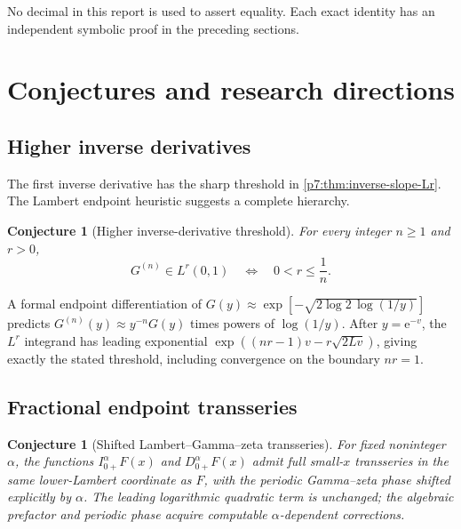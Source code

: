\documentclass[11pt,oneside]{article}
\newtheorem{conjecture}[theorem]{Conjecture}
\theoremstyle{definition}
\theoremstyle{remark}
\newcommand{\e}{\mathrm e}
\newcommand{\1}{\mathbf 1}
\begin{document}
No decimal in this report is used to assert equality.  Each exact identity has an independent
symbolic proof in the preceding sections.

\section{Conjectures and research directions}
\label{p7:sec:future}

\subsection{Higher inverse derivatives}

The first inverse derivative has the sharp threshold in \cref{p7:thm:inverse-slope-Lr}.  The
Lambert endpoint heuristic suggests a complete hierarchy.

\begin{conjecture}[Higher inverse-derivative threshold]
\label{p7:conj:higher-G-derivatives}
For every integer $n\ge1$ and $r>0$,
\begin{equation}
 G^{(n)}\in L^r(0,1)
 \quad\Longleftrightarrow\quad
 0<r\le\frac1n.
 \label{p7:eq:conj-higher-G}
\end{equation}
\statusopen
\end{conjecture}

A formal endpoint differentiation of
$G(y)\approx\exp[-\sqrt{2\log2\,\log(1/y)}]$ predicts
$G^{(n)}(y)\approx y^{-n}G(y)$ times powers of $\log(1/y)$.  After $y=\e^{-v}$, the $L^r$
integrand has leading exponential $\exp((nr-1)v-r\sqrt{2Lv})$, giving exactly the stated
threshold, including convergence on the boundary $nr=1$.

\subsection{Fractional endpoint transseries}

\begin{conjecture}[Shifted Lambert--Gamma--zeta transseries]
\label{p7:conj:fractional-transseries}
For fixed noninteger $\alpha$, the functions
$I_{0+}^{\alpha}F(x)$ and $D_{0+}^{\alpha}F(x)$ admit full small-$x$ transseries in the same
lower-Lambert coordinate as $F$, with the periodic Gamma--zeta phase shifted explicitly by
$\alpha$.  The leading logarithmic quadratic term is unchanged; the algebraic prefactor and
periodic phase acquire computable $\alpha$-dependent corrections.
\statusopen
\end{conjecture}
\end{document}
